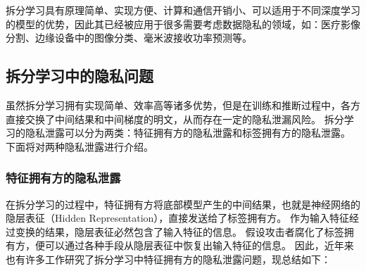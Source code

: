 拆分学习具有原理简单、实现方便、计算和通信开销小、可以适用于不同深度学习的模型的优势，因此其已经被应用于很多需要考虑数据隐私的领域，如：医疗影像分割\cite{roth2022split_unet}、边缘设备中的图像分类\cite{fagbohungbe2022split_edge_image,palanisamy2021spliteasy}、毫米波接收功率预测\cite{koda2020split_mmwave}等。

\subsection{拆分学习中的隐私问题}
虽然拆分学习拥有实现简单、效率高等诸多优势，但是在训练和推断过程中，各方直接交换了中间结果和中间梯度的明文，从而存在一定的隐私泄漏风险。
%
拆分学习的隐私泄露可以分为两类：特征拥有方的隐私泄露和标签拥有方的隐私泄露。
%
下面将对两种隐私泄露进行介绍。
%
\subsubsection{特征拥有方的隐私泄露}
在拆分学习的过程中，特征拥有方将底部模型产生的中间结果，也就是神经网络的隐层表征（Hidden Representation），直接发送给了标签拥有方。
%
作为输入特征经过变换的结果，隐层表征必然包含了输入特征的信息。
%
假设攻击者腐化了标签拥有方，便可以通过各种手段从隐层表征中恢复出输入特征的信息。
因此，近年来也有许多工作研究了拆分学习中特征拥有方的隐私泄露问题，现总结如下：
%

